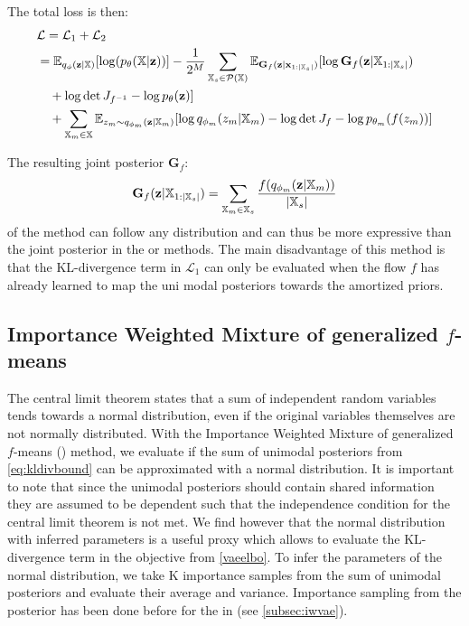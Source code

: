 The total loss is then:
\begin{equation}
    \begin{split}
        &\mathcal{L} = \mathcal{L}_1 + \mathcal{L}_2\\
        &= \mathbb{E}_{q_{\phi}(\textbf{z}|\mathbb{X})}[\log (p_{\theta}(\mathbb{X}|\textbf{z}))] - \frac{1}{2^M} \sum _{\mathbb{X}_s \in \mathcal{P}(\mathbb{X})} \mathbb{E}_{\textbf{G}_f(\textbf{z}|\textbf{x}_{1:|\mathbb{X}_s|})}[\log \textbf{G}_f(\textbf{z}|\mathbb{X}_{1:|\mathbb{X}_s|})\\
        &\quad + \log \det J_{f^{-1}}- \log p_{\theta}(\textbf{z}) ]\\
        &\quad + \sum _{\mathbb{X}_m \in \mathbb{X}} \mathbb{E}_{z_m \sim q_{\phi_m}(\textbf{z}|\mathbb{X}_m)} [\log q_{\phi_m}(z_m|\mathbb{X}_m) - \log \det J_f  - \log p_{\theta_m}(f(z_m))]
    \end{split}
\end{equation}

The resulting joint posterior $\textbf{G}_f$:
\begin{equation}
    \textbf{G}_f(\textbf{z}|\mathbb{X}_{1:|\mathbb{X}_s|}) =\sum _{\mathbb{X}_m \in \mathbb{X}_s} \frac{f(q_{\phi_m}(\textbf{z}|\mathbb{X}_m))}{|\mathbb{X}_s|}
\end{equation}
of the  method can follow any distribution and can thus be more expressive than the joint posterior in the  or  methods.
The main disadvantage of this method is that the KL-divergence term in $\mathcal{L}_1$ can only be evaluated when the flow $f$ has already learned to map the uni modal posteriors towards the amortized priors.



\subsection{Importance Weighted Mixture of generalized $f$-means} \label{subsubsec:iwMogfM}
The central limit theorem states that a sum of independent random variables tends towards a normal distribution, even if the original variables themselves are not normally distributed.
With the Importance Weighted Mixture of generalized $f$-means () method, we evaluate if the sum of unimodal posteriors from \cref{eq:kldivbound} can be approximated with a normal distribution.
It is important to note that since the unimodal posteriors should contain shared information they are assumed to be dependent such that the independence condition for the central limit theorem is not met.
We find however that the normal distribution with inferred parameters is a useful proxy which allows to evaluate the KL-divergence term in the objective from \cref{vaeelbo}.
To infer the parameters of the normal distribution, we take K importance samples from the sum of unimodal posteriors and evaluate their average and variance.
Importance sampling from the posterior has been done before for the  in \citep{burda_importance_2016} (see \cref{subsec:iwvae}).

